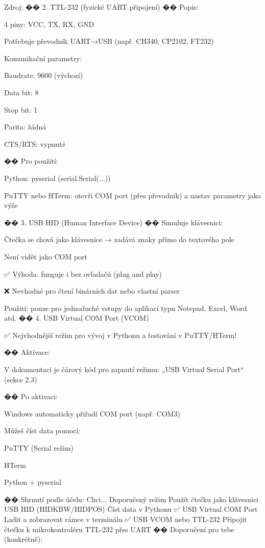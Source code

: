 Zdroj:
�� 2. TTL-232 (fyzické UART připojení)
�� Popis:

    4 piny: VCC, TX, RX, GND

    Potřebuje převodník UART→USB (např. CH340, CP2102, FT232)

    Komunikační parametry:

        Baudrate: 9600 (výchozí)

        Data bit: 8

        Stop bit: 1

        Parita: žádná

        CTS/RTS: vypnuté​

�� Pro použití:

    Python: pyserial (serial.Serial(...))

    PuTTY nebo HTerm: otevři COM port (přes převodník) a nastav parametry jako výše

�� 3. USB HID (Human Interface Device)
�� Simuluje klávesnici:

    Čtečka se chová jako klávesnice → zadává znaky přímo do textového pole

    Není vidět jako COM port

    ✅ Výhoda: funguje i bez ovladačů (plug and play)

    ❌ Nevhodné pro čtení binárních dat nebo vlastní parser

Použití: pouze pro jednoduché vstupy do aplikací typu Notepad, Excel, Word atd.
�� 4. USB Virtual COM Port (VCOM)

    ✅ Nejvhodnější režim pro vývoj v Pythonu a testování v PuTTY/HTerm!

��️ Aktivace:

    V dokumentaci je čárový kód pro zapnutí režimu:
    „USB Virtual Serial Port“
    (sekce 2.3)​

�� Po aktivaci:

    Windows automaticky přiřadí COM port (např. COM3)

    Můžeš číst data pomocí:

        PuTTY (Serial režim)

        HTerm

        Python + pyserial

�� Shrnutí podle účelu:
Chci...	Doporučený režim
Použít čtečku jako klávesnici	USB HID (HIDKBW/HIDPOS)
Číst data v Pythonu	✅ USB Virtual COM Port
Ladit a zobrazovat rámce v terminálu	✅ USB VCOM nebo TTL-232
Připojit čtečku k mikrokontroléru	TTL-232 přes UART
�� Doporučení pro tebe (konkrétně):

